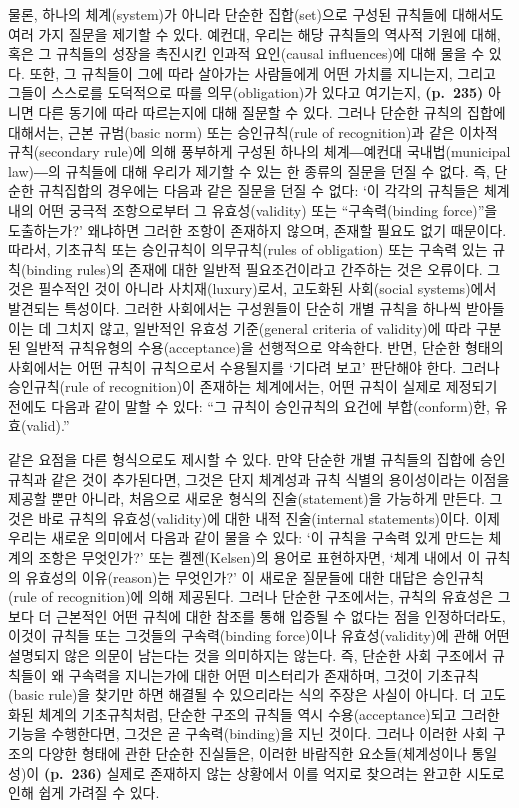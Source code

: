물론, 하나의 체계(system)가 아니라 단순한 집합(set)으로 구성된 규칙들에
대해서도 여러 가지 질문을 제기할 수 있다. 예컨대, 우리는 해당 규칙들의
역사적 기원에 대해, 혹은 그 규칙들의 성장을 촉진시킨 인과적 요인(causal
influences)에 대해 물을 수 있다. 또한, 그 규칙들이 그에 따라 살아가는
사람들에게 어떤 가치를 지니는지, 그리고 그들이 스스로를 도덕적으로 따를
의무(obligation)가 있다고 여기는지, \textbf{(p.~235)} 아니면 다른 동기에
따라 따르는지에 대해 질문할 수 있다. 그러나 단순한 규칙의 집합에
대해서는, 근본 규범(basic norm) 또는 승인규칙(rule of recognition)과
같은 이차적 규칙(secondary rule)에 의해 풍부하게 구성된 하나의
체계―예컨대 국내법(municipal law)―의 규칙들에 대해 우리가 제기할 수 있는
한 종류의 질문을 던질 수 없다. 즉, 단순한 규칙집합의 경우에는 다음과
같은 질문을 던질 수 없다: `이 각각의 규칙들은 체계 내의 어떤 궁극적
조항으로부터 그 유효성(validity) 또는 ``구속력(binding force)''을
도출하는가?' 왜냐하면 그러한 조항이 존재하지 않으며, 존재할 필요도 없기
때문이다. 따라서, 기초규칙 또는 승인규칙이 의무규칙(rules of obligation)
또는 구속력 있는 규칙(binding rules)의 존재에 대한 일반적 필요조건이라고
간주하는 것은 오류이다. 그것은 필수적인 것이 아니라 사치재(luxury)로서,
고도화된 사회(social systems)에서 발견되는 특성이다. 그러한 사회에서는
구성원들이 단순히 개별 규칙을 하나씩 받아들이는 데 그치지 않고, 일반적인
유효성 기준(general criteria of validity)에 따라 구분된 일반적
규칙유형의 수용(acceptance)을 선행적으로 약속한다. 반면, 단순한 형태의
사회에서는 어떤 규칙이 규칙으로서 수용될지를 `기다려 보고' 판단해야
한다. 그러나 승인규칙(rule of recognition)이 존재하는 체계에서는, 어떤
규칙이 실제로 제정되기 전에도 다음과 같이 말할 수 있다: ``그 규칙이
승인규칙의 요건에 부합(conform)한, 유효(valid).''

같은 요점을 다른 형식으로도 제시할 수 있다. 만약 단순한 개별 규칙들의
집합에 승인규칙과 같은 것이 추가된다면, 그것은 단지 체계성과 규칙 식별의
용이성이라는 이점을 제공할 뿐만 아니라, 처음으로 새로운 형식의
진술(statement)을 가능하게 만든다. 그것은 바로 규칙의 유효성(validity)에
대한 내적 진술(internal statements)이다. 이제 우리는 새로운 의미에서
다음과 같이 물을 수 있다: `이 규칙을 구속력 있게 만드는 체계의 조항은
무엇인가?' 또는 켈젠(Kelsen)의 용어로 표현하자면, `체계 내에서 이 규칙의
유효성의 이유(reason)는 무엇인가?' 이 새로운 질문들에 대한 대답은
승인규칙(rule of recognition)에 의해 제공된다. 그러나 단순한 구조에서는,
규칙의 유효성은 그보다 더 근본적인 어떤 규칙에 대한 참조를 통해 입증될
수 없다는 점을 인정하더라도, 이것이 규칙들 또는 그것들의 구속력(binding
force)이나 유효성(validity)에 관해 어떤 설명되지 않은 의문이 남는다는
것을 의미하지는 않는다. 즉, 단순한 사회 구조에서 규칙들이 왜 구속력을
지니는가에 대한 어떤 미스터리가 존재하며, 그것이 기초규칙(basic rule)을
찾기만 하면 해결될 수 있으리라는 식의 주장은 사실이 아니다. 더 고도화된
체계의 기초규칙처럼, 단순한 구조의 규칙들 역시 수용(acceptance)되고
그러한 기능을 수행한다면, 그것은 곧 구속력(binding)을 지닌 것이다.
그러나 이러한 사회 구조의 다양한 형태에 관한 단순한 진실들은, 이러한
바람직한 요소들(체계성이나 통일성)이 \textbf{(p.~236)} 실제로 존재하지
않는 상황에서 이를 억지로 찾으려는 완고한 시도로 인해 쉽게 가려질 수
있다.

